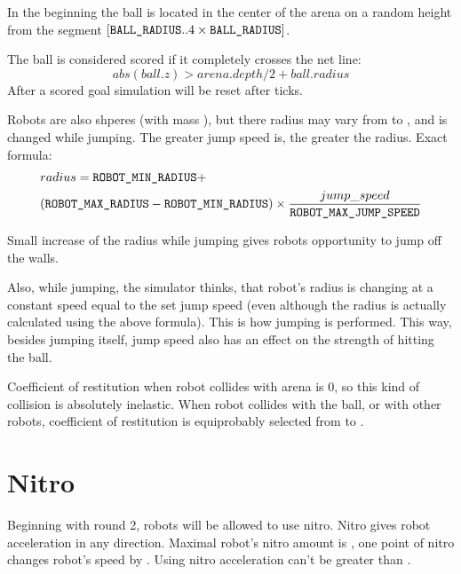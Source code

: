 In the beginning the ball is located in the center of the arena on a random height from the segment
$[\texttt{BALL\_RADIUS} .. 4\times\texttt{BALL\_RADIUS}]$.

The ball is considered scored if it completely crosses the net line:
\begin{equation}
      abs(ball.z)>arena.depth/2+ball.radius
\end{equation}
After a scored goal simulation will be reset after  ticks.

Robots are also shperes (with mass ), but there radius may vary from
 to ,
and is changed while jumping.
The greater jump speed is, the greater the radius.
Exact formula:
\begin{equation}
	\begin{split}
		&radius=\texttt{ROBOT\_MIN\_RADIUS}+\\
		&(\texttt{ROBOT\_MAX\_RADIUS}-\texttt{ROBOT\_MIN\_RADIUS})\times\frac{jump\_speed}{\texttt{ROBOT\_MAX\_JUMP\_SPEED}}
	\end{split}
\end{equation}

Small increase of the radius while jumping gives robots opportunity to jump off the walls.

Also, while jumping, the simulator thinks, that robot's radius is changing at a constant speed equal to the set jump speed
(even although the radius is actually calculated using the above formula).
This is how jumping is performed.
This way, besides jumping itself, jump speed also has an effect on the strength of hitting the ball.

Coefficient of restitution when robot collides with arena is $0$,
so this kind of collision is absolutely inelastic.
When robot collides with the ball, or with other robots,
coefficient of restitution is equiprobably selected from  to .

\section{Nitro}

Beginning with round 2, robots will be allowed to use nitro.
Nitro gives robot acceleration in any direction.
Maximal robot's nitro amount is , one point of nitro changes robot's speed by .
Using nitro acceleration can't be greater than .

